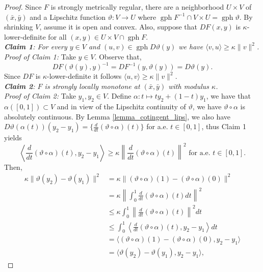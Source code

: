 \documentclass[smallextended,envcountsect,envcountsame]{svjour3}
\newcommand{\gph}{\operatorname{gph}}
\newcommand{\1}{\mathds{1}}
\begin{document}
	\begin{proof}
		Since $F$ is strongly metrically regular, there are a neighborhood $U\times V$ of $(\bar x,\bar y)$ and a Lipschitz function $\vartheta \colon V\to U$ where $\gph F^{-1}\cap V\times U = \gph \vartheta$. By shrinking $V$, assume it is open and convex. Also, suppose that $DF(x,y)$ is $\kappa$-lower-definite for all $(x,y)\in U\times V\cap \gph F$.\\
		\emph{{\bf Claim 1}: For every $y\in V$ and $(u,v)\in \gph D\vartheta(y)$ we have $\langle v,u \rangle\geq \kappa\|v\|^2$.}\\
		\emph{Proof of Claim 1:} Take $y\in V$. Observe that, $$DF(\vartheta(y),y)^{-1} = DF^{-1}(y,\vartheta(y)) = D\vartheta(y).$$ 
		Since $DF$ is $\kappa$-lower-definite it follows $\langle u,v\rangle\geq \kappa\|v\|^2$.\\
		\emph{{\bf Claim 2}: $F$ is strongly locally monotone at $(\bar x,\bar y)$ with modulus $\kappa$.}\\
		\emph{Proof of Claim 2:} Take $y_1,y_2\in V$. Define $\alpha\colon t\mapsto ty_2 + (1-t)y_1$, we have that $\alpha([0,1])\subset V$ and in view of the Lipschitz continuity of $\vartheta$, we have $\vartheta\circ \alpha$ is absolutely continuous. By Lemma \ref{lemma_cotingent_lips}, we also have $D\vartheta(\alpha(t))(y_2-y_1) = \{\frac{d}{dt}(\vartheta\circ \alpha)(t)\}$ for a.e. $t\in [0,1]$, thus Claim 1 yields
		\begin{equation*}
			\left\langle \frac{d}{dt}(\vartheta\circ \alpha)(t),y_2-y_1 \right\rangle\geq \kappa\left\|\frac{d}{dt}(\vartheta\circ \alpha)(t)\right\|^2 \text{ for a.e. }t\in [0,1].
		\end{equation*}
		Then,
		\begin{equation*}
			\begin{aligned}
				\kappa\|\vartheta(y_2)-\vartheta(y_1)\|^2& = \kappa \|(\vartheta\circ \alpha)(1) - (\vartheta\circ \alpha)(0)\|^2\\
				&= \kappa \left\|\int_0^1\frac{d}{dt}(\vartheta\circ \alpha)(t)dt \right\|^2\\
				&\leq \kappa\int_0^1\left\|\frac{d}{dt}(\vartheta\circ \alpha)(t)\right\|^2dt\\
				&\leq \int_0^1 \left\langle \frac{d}{dt}(\vartheta\circ \alpha)(t),y_2-y_1 \right\rangle dt\\
				&= \langle  (\vartheta\circ \alpha)(1) - (\vartheta\circ \alpha)(0),y_2-y_1\rangle \\
				&= \langle \vartheta(y_2) - \vartheta(y_1),y_2-y_1\rangle,
			\end{aligned}

\end{equation*}
\end{proof}
\end{document}
